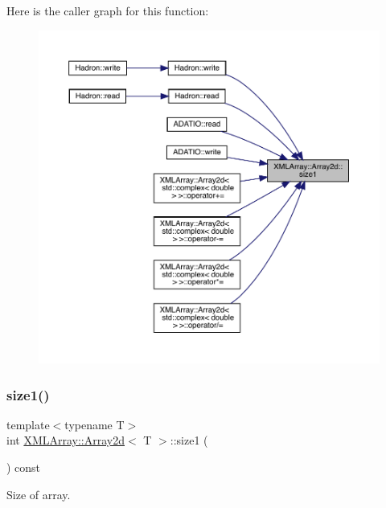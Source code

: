 Here is the caller graph for this function\+:\nopagebreak
\begin{figure}[H]
\begin{center}
\leavevmode
\includegraphics[width=350pt]{dc/ddc/classXMLArray_1_1Array2d_a0f5dd764b391ddffd3d89c71bbc6c614_icgraph}
\end{center}
\end{figure}
\mbox{\label{classXMLArray_1_1Array2d_a0f5dd764b391ddffd3d89c71bbc6c614}} 
\subsubsection{\texorpdfstring{size1()}{size1()}\hspace{0.1cm}{\footnotesize\ttfamily [2/2]}}
{\footnotesize\ttfamily template$<$typename T$>$ \\
int \mbox{\hyperlink{classXMLArray_1_1Array2d}{X\+M\+L\+Array\+::\+Array2d}}$<$ T $>$\+::size1 (\begin{DoxyParamCaption}{ }\end{DoxyParamCaption}) const\hspace{0.3cm}{\ttfamily [inline]}}



Size of array. 

